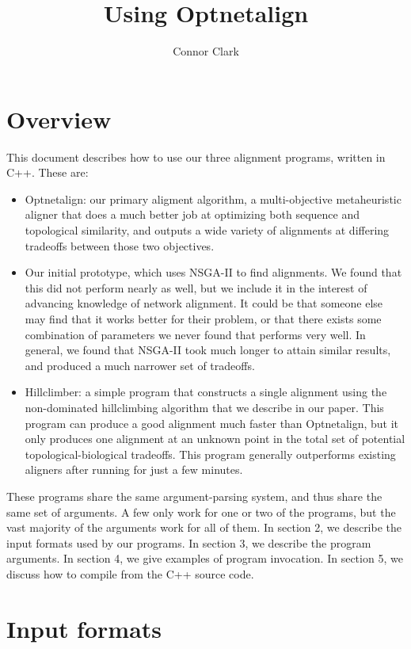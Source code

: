 \documentclass[11pt]{article} %
\title{Using Optnetalign}
\author{Connor Clark}
\begin{document}
\maketitle

\section{Overview}

This document describes how to use our three alignment programs, written in C++. These are:

\begin{itemize}
\item Optnetalign: our primary aligment algorithm, a multi-objective metaheuristic aligner that does a much better job at optimizing both sequence and topological similarity, and outputs a wide variety of alignments at differing tradeoffs between those two objectives.
\item Our initial prototype, which uses NSGA-II to find alignments. We found that this did not perform nearly as well, but we include it in the interest of advancing knowledge of network alignment. It could be that someone else may find that it works better for their problem, or that there exists some combination of parameters we never found that performs very well. In general, we found that NSGA-II took much longer to attain similar results, and produced a much narrower set of tradeoffs.
\item Hillclimber: a simple program that constructs a single alignment using the non-dominated hillclimbing algorithm that we describe in our paper. This program can produce a good alignment much faster than Optnetalign, but it only produces one alignment at an unknown point in the total set of potential topological-biological tradeoffs. This program generally outperforms existing aligners after running for just a few minutes.
\end{itemize}

These programs share the same argument-parsing system, and thus share the same set of arguments. A few only work for one or two of the programs, but the vast majority of the arguments work for all of them. In section 2, we describe the input formats used by our programs. In section 3, we describe the program arguments. In section 4, we give examples of program invocation. In section 5, we discuss how to compile from the C++ source code.

\section{Input formats}
\end{document}
